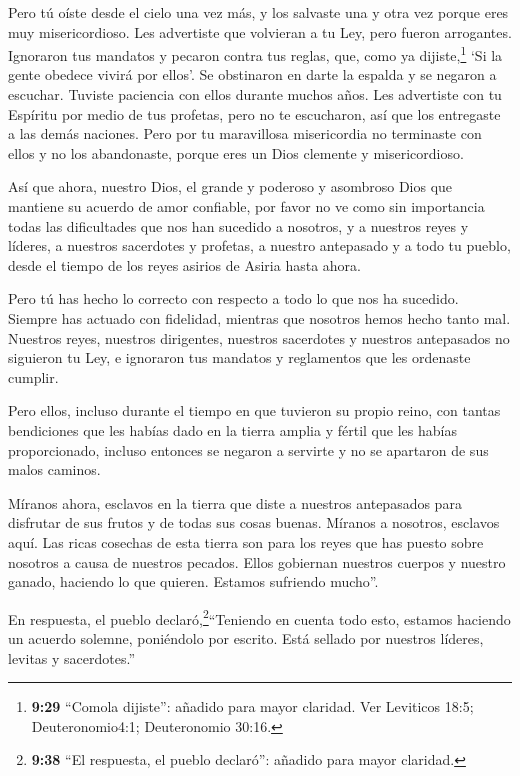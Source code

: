 Pero tú oíste desde el cielo una vez más, y los salvaste una y otra vez
porque eres muy misericordioso.  Les advertiste que
volvieran a tu Ley, pero fueron arrogantes. Ignoraron tus mandatos y
pecaron contra tus reglas, que, como ya dijiste,\footnote{\textbf{9:29}
  ``Comola dijiste'': añadido para mayor claridad. Ver Leviticos 18:5;
  Deuteronomio4:1; Deuteronomio 30:16.} `Si la gente obedece vivirá por
ellos'. Se obstinaron en darte la espalda y se negaron a escuchar.
 Tuviste paciencia con ellos durante muchos años. Les
advertiste con tu Espíritu por medio de tus profetas, pero no te
escucharon, así que los entregaste a las demás naciones. 
Pero por tu maravillosa misericordia no terminaste con ellos y no los
abandonaste, porque eres un Dios clemente y misericordioso.

 Así que ahora, nuestro Dios, el grande y poderoso y
asombroso Dios que mantiene su acuerdo de amor confiable, por favor no
ve como sin importancia todas las dificultades que nos han sucedido a
nosotros, y a nuestros reyes y líderes, a nuestros sacerdotes y
profetas, a nuestro antepasado y a todo tu pueblo, desde el tiempo de
los reyes asirios de Asiria hasta ahora.

 Pero tú has hecho lo correcto con respecto a todo lo que
nos ha sucedido. Siempre has actuado con fidelidad, mientras que
nosotros hemos hecho tanto mal.  Nuestros reyes, nuestros
dirigentes, nuestros sacerdotes y nuestros antepasados no siguieron tu
Ley, e ignoraron tus mandatos y reglamentos que les ordenaste cumplir.

 Pero ellos, incluso durante el tiempo en que tuvieron su
propio reino, con tantas bendiciones que les habías dado en la tierra
amplia y fértil que les habías proporcionado, incluso entonces se
negaron a servirte y no se apartaron de sus malos caminos.

 Míranos ahora, esclavos en la tierra que diste a nuestros
antepasados para disfrutar de sus frutos y de todas sus cosas buenas.
Míranos a nosotros, esclavos aquí.  Las ricas cosechas de
esta tierra son para los reyes que has puesto sobre nosotros a causa de
nuestros pecados. Ellos gobiernan nuestros cuerpos y nuestro ganado,
haciendo lo que quieren. Estamos sufriendo mucho''.

 En respuesta, el pueblo declaró,\footnote{\textbf{9:38}
  ``El respuesta, el pueblo declaró'': añadido para mayor claridad.}``Teniendo
en cuenta todo esto, estamos haciendo un acuerdo solemne, poniéndolo por
escrito. Está sellado por nuestros líderes, levitas y sacerdotes.''

